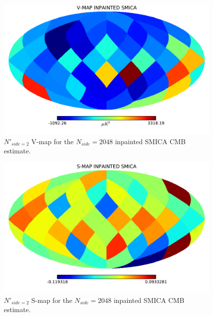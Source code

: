 \begin{figure}
\centering
\includegraphics[width=\textwidth]{figures/chapter-vsk/vmap-inpainted-smica.pdf}
\caption{$N'_{side = 2}$ V-map for the $N_{side} = 2048$ inpainted SMICA CMB estimate.}
\label{Fig:3}
\end{figure}

\begin{figure}
\centering
\includegraphics[width=\textwidth]{figures/chapter-vsk/smap-inpainted-smica.pdf}
\caption{$N'_{side = 2}$ S-map for the $N_{side} = 2048$ inpainted SMICA CMB estimate.}
\label{Fig:3a}
\end{figure}

